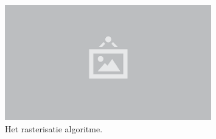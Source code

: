 \begin{figure}
  \centering
  \includegraphics[width=0.8\textwidth]{./img/raw/placeholder.png}
  \caption{Het rasterisatie algoritme.}
  \label{fig:rs-rasterisatie}
\end{figure}
